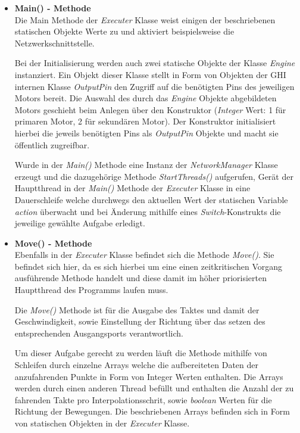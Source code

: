 \begin{itemize}
\item \textbf{Main() - Methode}\\
Die Main Methode der \textit{Executer} Klasse weist einigen der beschriebenen statischen Objekte Werte zu und aktiviert beispielsweise die Netzwerkschnittstelle.

Bei der Initialisierung werden auch zwei statische Objekte der Klasse \textit{Engine} instanziert. Ein Objekt dieser Klasse stellt in Form von Objekten der GHI internen Klasse \textit{OutputPin} den Zugriff auf die benötigten Pins des jeweiligen Motors bereit. Die Auswahl des durch das \textit{Engine} Objekte abgebildeten Motors geschieht beim Anlegen über den Konstruktor (\textit{Integer} Wert: 1 für primaren Motor, 2 für sekundären Motor). Der Konstruktor initialisiert hierbei die jeweils benötigten Pins als \textit{OutputPin} Objekte und macht sie öffentlich zugreifbar.

Wurde in der \textit{Main()} Methode eine Instanz der \textit{NetworkManager} Klasse erzeugt und die dazugehörige Methode \textit{StartThreads()} aufgerufen, Gerät der Hauptthread in der \textit{Main()} Methode der \textit{Executer} Klasse in eine Dauerschleife welche durchwegs den aktuellen Wert der statischen Variable \textit{action} überwacht und bei Änderung mithilfe eines \textit{Switch}-Konstrukts die jeweilige gewählte Aufgabe erledigt.

\item \textbf{Move() - Methode}\\
Ebenfalls in der \textit{Executer} Klasse befindet sich die Methode \textit{Move()}. Sie befindet sich hier, da es sich hierbei um eine einen zeitkritischen Vorgang ausführende Methode handelt und diese damit im höher priorisierten Hauptthread des Programms laufen muss.

Die \textit{Move()} Methode ist für die Ausgabe des Taktes und damit der Geschwindigkeit, sowie Einstellung der Richtung über das setzen des entsprechenden Ausgangsports verantwortlich.

Um dieser Aufgabe gerecht zu werden läuft die Methode mithilfe von Schleifen durch einzelne Arrays welche die aufbereiteten Daten der anzufahrenden Punkte in Form von Integer Werten enthalten. Die Arrays werden durch einen anderen Thread befüllt und enthalten die Anzahl der zu fahrenden Takte pro Interpolationsschrit, sowie \textit{boolean} Werten für die Richtung der Bewegungen.
Die beschriebenen Arrays befinden sich in Form von statischen Objekten in der \textit{Executer} Klasse.


\end{itemize}
